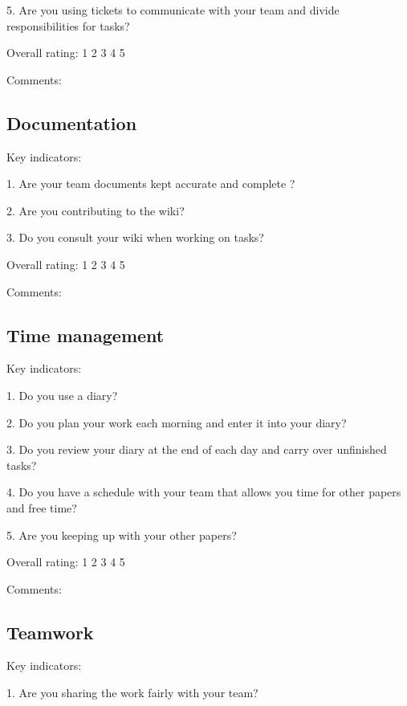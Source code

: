 \documentclass{article}   	%
\begin{document}
5.  Are you using tickets to communicate with your team and divide responsibilities for tasks?

Overall rating: \hskip 1cm 1 \hskip 1cm 2 \hskip 1cm 3 \hskip 1cm 4 \hskip 1cm 5 

Comments:

\vskip 5cm



\subsection*{Documentation}

Key indicators: 

1.  Are your team documents kept accurate and complete ?

2.  Are you contributing to the wiki?

3.  Do you consult your wiki when working on tasks?

Overall rating: \hskip 1cm 1 \hskip 1cm 2 \hskip 1cm 3 \hskip 1cm 4 \hskip 1cm 5 

Comments:

\newpage

\subsection*{Time management}

Key indicators: 

1.  Do you use a diary?

2.  Do you plan your work each morning and enter it into your diary?

3.  Do you review your diary at the end of each day and carry over unfinished tasks?

4.  Do you have a schedule with your team that allows you time for other papers and free time?

5.  Are you keeping up with your other papers?

Overall rating: \hskip 1cm 1 \hskip 1cm 2 \hskip 1cm 3 \hskip 1cm 4 \hskip 1cm 5 

Comments:

\vskip 5cm

\subsection*{Teamwork}

Key indicators: 

1.  Are you sharing the work fairly with your team?
\end{document}

